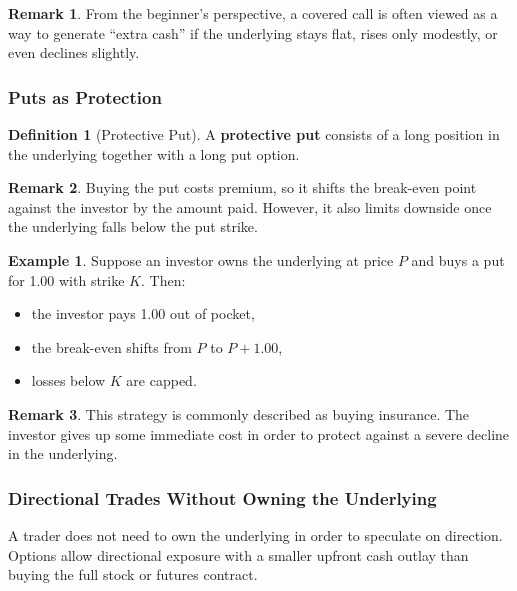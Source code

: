 \documentclass[11pt]{article}
\theoremstyle{definition}
\newtheorem{definition}{Definition}[section]
\newtheorem{example}{Example}[section]
\newtheorem{remark}{Remark}[section]
\begin{document}
\begin{remark}
From the beginner's perspective, a covered call is often viewed as a way to generate ``extra cash'' if the underlying stays flat, rises only modestly, or even declines slightly.
\end{remark}

\subsubsection{Puts as Protection}

\begin{definition}[Protective Put]
A \textbf{protective put} consists of a long position in the underlying together with a long put option.
\end{definition}

\begin{remark}
Buying the put costs premium, so it shifts the break-even point against the investor by the amount paid. However, it also limits downside once the underlying falls below the put strike.
\end{remark}

\begin{example}
Suppose an investor owns the underlying at price \(P\) and buys a put for 1.00 with strike \(K\). Then:
\begin{itemize}[leftmargin=2em]
    \item the investor pays 1.00 out of pocket,
    \item the break-even shifts from \(P\) to \(P+1.00\),
    \item losses below \(K\) are capped.
\end{itemize}
\end{example}

\begin{remark}
This strategy is commonly described as buying insurance. The investor gives up some immediate cost in order to protect against a severe decline in the underlying.
\end{remark}

\subsubsection{Directional Trades Without Owning the Underlying}

A trader does not need to own the underlying in order to speculate on direction. Options allow directional exposure with a smaller upfront cash outlay than buying the full stock or futures contract.
\end{document}

